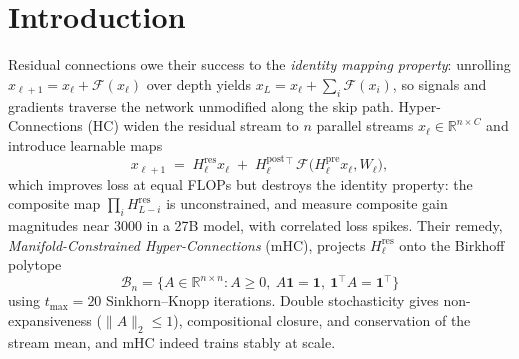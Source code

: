 \documentclass[11pt]{article}
\newcommand{\R}{\mathbb{R}}
\newcommand{\ones}{\mathbf{1}}
\newcommand{\Hres}{H^{\mathrm{res}}}
\newcommand{\Hpre}{H^{\mathrm{pre}}}
\newcommand{\Hpost}{H^{\mathrm{post}}}
\begin{document}
\section{Introduction}

Residual connections \citep{he2016resnet,he2016identity} owe their success to the \emph{identity mapping property}: unrolling $x_{\ell+1}=x_\ell+\mathcal{F}(x_\ell)$ over depth yields $x_L=x_\ell+\sum_i \mathcal{F}(x_i)$, so signals and gradients traverse the network unmodified along the skip path. Hyper-Connections (HC) \citep{zhu2024hc} widen the residual stream to $n$ parallel streams $x_\ell\in\R^{n\times C}$ and introduce learnable maps
\begin{equation}
x_{\ell+1} \;=\; \Hres_\ell x_\ell \;+\; \Hpost_\ell{}^{\!\top}\,\mathcal{F}\!\big(\Hpre_\ell x_\ell, W_\ell\big),
\label{eq:hc}
\end{equation}
which improves loss at equal FLOPs but destroys the identity property: the composite map $\prod_{i}\Hres_{L-i}$ is unconstrained, and \citet{xie2025mhc} measure composite gain magnitudes near $3000$ in a 27B model, with correlated loss spikes. Their remedy, \emph{Manifold-Constrained Hyper-Connections} (mHC), projects $\Hres_\ell$ onto the Birkhoff polytope
\begin{equation}
\mathcal{B}_n=\{A\in\R^{n\times n}: A\ge 0,\ A\ones=\ones,\ \ones^{\!\top}A=\ones^{\!\top}\}
\end{equation}
using $t_{\max}=20$ Sinkhorn--Knopp \citep{sinkhorn1967} iterations. Double stochasticity gives non-expansiveness ($\|A\|_2\le1$), compositional closure, and conservation of the stream mean, and mHC indeed trains stably at scale.
\end{document}
